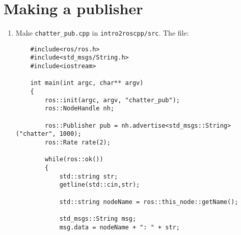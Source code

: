 \documentclass{article}
\begin{document}
    \section{Making a publisher}
        \begin{enumerate}
            \item Make \texttt{chatter\_pub.cpp} in \texttt{intro2roscpp/src}. The file:
            \begin{verbatim}
    #include<ros/ros.h>
    #include<std_msgs/String.h>
    #include<iostream>

    int main(int argc, char** argv)
    {
        ros::init(argc, argv, "chatter_pub");
        ros::NodeHandle nh;

        ros::Publisher pub = nh.advertise<std_msgs::String>("chatter", 1000);
        ros::Rate rate(2);

        while(ros::ok())
        {
            std::string str;
            getline(std::cin,str);

            std::string nodeName = ros::this_node::getName();

            std_msgs::String msg;
            msg.data = nodeName + ": " + str;


\end{verbatim}
\end{enumerate}
\end{document}
